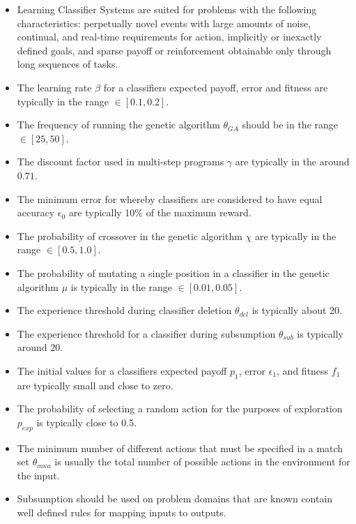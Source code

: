 \documentclass[a4paper, 11pt]{article}
\begin{document}
\begin{itemize}
	\item Learning Classifier Systems are suited for problems with the following characteristics: perpetually novel events with large amounts of noise, continual, and real-time requirements for action, implicitly or inexactly defined goals, and sparse payoff or reinforcement obtainable only through long sequences of tasks.
	\item The learning rate $\beta$ for a classifiers expected payoff, error and fitness are typically in the range $\in [0.1,0.2]$.
	\item The frequency of running the genetic algorithm $\theta_{GA}$ should be in the range $\in [25,50]$.
	\item The discount factor used in multi-step programs $\gamma$ are typically in the around $0.71$.
	\item The minimum error for whereby classifiers are considered to have equal accuracy $\epsilon_{0}$ are typically 10\% of the maximum reward.
	\item The probability of crossover in the genetic algorithm $\chi$ are typically in the range $\in [0.5,1.0]$.
	\item The probability of mutating a single position in a classifier in the genetic algorithm $\mu$ is typically in the range $\in [0.01,0.05]$.
	\item The experience threshold during classifier deletion $\theta_{del}$ is typically about 20.
	\item The experience threshold for a classifier during subsumption $\theta_{sub}$ is typically around 20.
	\item The initial values for a classifiers expected payoff $p_1$, error $\epsilon_1$, and fitness $f_1$ are typically small and close to zero.
	\item The probability of selecting a random action for the purposes of exploration $p_{exp}$ is typically close to 0.5.
	\item The minimum number of different actions that must be specified in a match set $\theta_{mna}$ is usually the total number of possible actions in the environment for the input.
	\item Subsumption should be used on problem domains that are known contain well defined rules for mapping inputs to outputs.
\end{itemize}

\end{document}
